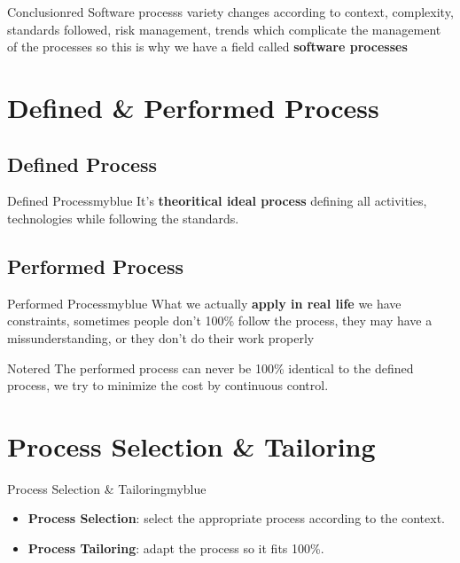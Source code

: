 \documentclass{report}
\begin{document}
\vspace{0.1cm}

\begin{prettyBox}{Conclusion}{red}
    Software processs variety changes according to context, complexity, standards followed, risk management, trends which complicate
    the management of the processes so this is why we have a field called \textbf{software processes}
\end{prettyBox}

\vspace{0.25cm}

\section{Defined \& Performed Process}

\subsection{Defined Process}
\begin{prettyBox}{Defined Process}{myblue}
    It's \textbf{theoritical ideal process} defining all activities, technologies while following the standards.
\end{prettyBox}

\vspace{0.15cm}
\subsection{Performed Process}
\begin{prettyBox}{Performed Process}{myblue}
    What we actually \textbf{apply in real life} we have constraints, sometimes people don't 100\% follow the process, 
    they may have a missunderstanding, or they don't do their work properly
\end{prettyBox}

\vspace{0.15cm}
\begin{prettyBox}{Note}{red}
    The performed process can never be 100\% identical to the defined process, we try to minimize the cost by continuous control.
\end{prettyBox}

\vspace{0.25cm}

\section{Process Selection \& Tailoring}
\begin{prettyBox}{Process Selection \& Tailoring}{myblue}
    \begin{itemize}
        \item \textbf{Process Selection}: select the appropriate process according to the context.
        \item \textbf{Process Tailoring}: adapt the process so it fits 100\%.
    \end{itemize}
\end{prettyBox}
\end{document}
